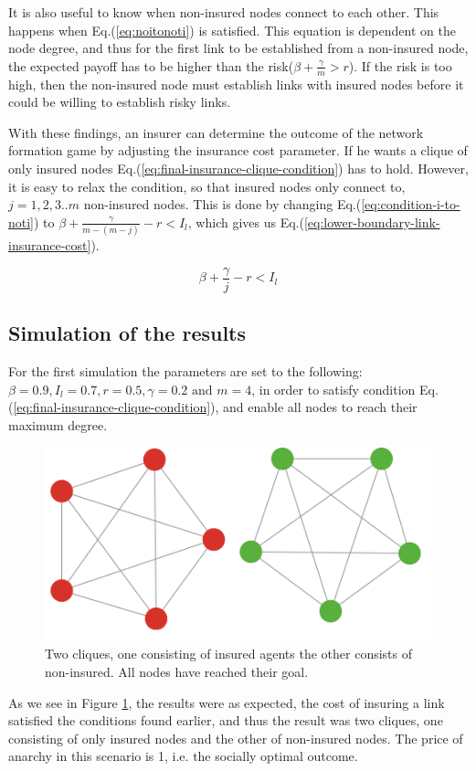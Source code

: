 It is also useful to know when non-insured nodes connect to each other. This happens when Eq.(\ref{eq:noitonoti}) is satisfied. This equation is dependent on the node degree, and thus for the first link to be established from a non-insured node, the expected payoff has to be higher than the risk($\beta+\frac{\gamma}{m}>r$). If the risk is too high, then the non-insured node must establish links with insured nodes before it could be willing to establish risky links.

With these findings, an insurer can determine the outcome of the network formation game by adjusting the insurance cost parameter.
If he wants a clique of only insured nodes Eq.(\ref{eq:final-insurance-clique-condition}) has to
hold. However, it is easy to relax the condition, so that insured nodes only connect to, $j=1,2,3..m$ non-insured nodes.
   This is done by changing Eq.(\ref{eq:condition-i-to-noti}) to $\beta+\frac{\gamma}{m-(m-j)}-r<I_{l}$, which
    gives us Eq.(\ref{eq:lower-boundary-link-insurance-cost}).

\begin{equation} 
\beta+\frac{\gamma}{j}-r<I_{l}
\label{eq:lower-boundary-link-insurance-cost}
\end{equation} 

\subsection{Simulation of the results}
For the first simulation the parameters are set to the following: $\beta=0.9, I_{l}=0.7, r=0.5, \gamma=0.2 \text{ and }m=4$, in order to satisfy condition Eq.(\ref{eq:final-insurance-clique-condition}), and enable all nodes to reach their maximum degree.  

\begin{figure}[h]
\centering
  \includegraphics[scale=0.5]{../Figures/BonusGameInsuredClique.png}
  \caption{\label{fig:bonusoptimal} Two cliques, one consisting of insured agents the other consists of non-insured. All nodes have reached their goal. }
\end{figure}
As we see in Figure \ref{fig:bonusoptimal}, the results were as expected, the cost of insuring a link satisfied the conditions found earlier, and thus the result was two cliques, one consisting of only insured nodes and the other of non-insured nodes.
The price of anarchy in this scenario is 1, i.e. the socially optimal outcome. 

